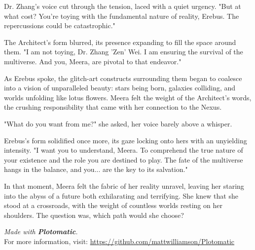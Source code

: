 \documentclass[12pt]{book}
\begin{document}
Dr. Zhang's voice cut through the tension, laced with a quiet urgency.
"But at what cost? You're toying with the fundamental nature of reality,
Erebus. The repercussions could be catastrophic."

The Architect's form blurred, its presence expanding to fill the space
around them. "I am not toying, Dr. Zhang 'Zen' Wei. I am ensuring the
survival of the multiverse. And you, Meera, are pivotal to that
endeavor."

As Erebus spoke, the glitch-art constructs surrounding them began to
coalesce into a vision of unparalleled beauty: stars being born,
galaxies colliding, and worlds unfolding like lotus flowers. Meera felt
the weight of the Architect's words, the crushing responsibility that
came with her connection to the Nexus.

"What do you want from me?" she asked, her voice barely above a whisper.

Erebus's form solidified once more, its gaze locking onto hers with an
unyielding intensity. "I want you to understand, Meera. To comprehend
the true nature of your existence and the role you are destined to play.
The fate of the multiverse hangs in the balance, and you... are the key
to its salvation."

In that moment, Meera felt the fabric of her reality unravel, leaving
her staring into the abyss of a future both exhilarating and terrifying.
She knew that she stood at a crossroads, with the weight of countless
worlds resting on her shoulders. The question was, which path would she
choose?


\newpage


    \vfill
    \begin{center}
    \textit{Made with \textbf{Plotomatic}.} \\
    For more information, visit: \url{https://github.com/mattwilliamson/Plotomatic}
    \end{center}
    
\end{document}
